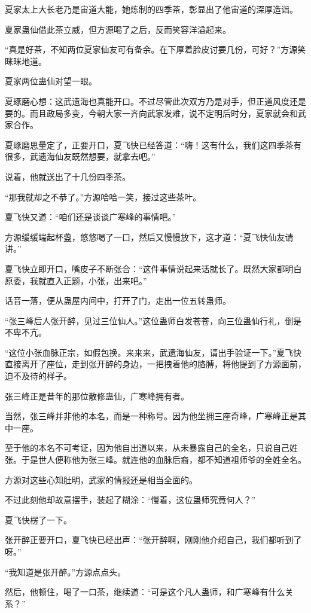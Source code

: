 \begin{this_body}
夏家太上大长老乃是宙道大能，她炼制的四季茶，彰显出了他宙道的深厚造诣。

夏家蛊仙借此茶立威，但方源喝了之后，反而笑容洋溢起来。

“真是好茶，不知两位夏家仙友可有备余。在下厚着脸皮讨要几份，可好？”方源笑眯眯地道。

夏家两位蛊仙对望一眼。

夏琢磨心想：这武遗海也真能开口。不过尽管此次双方乃是对手，但正道风度还是要的。而且政局多变，今朝大家一齐向武家发难，说不定明后时分，夏家就会和武家合作。

夏琢磨思量定了，正要开口，夏飞快已经答道：“嗨！这有什么，我们这四季茶有很多，武遗海仙友既然想要，就拿去吧。”

说着，他就送出了十几份四季茶。

“那我就却之不恭了。”方源哈哈一笑，接过这些茶叶。

夏飞快又道：“咱们还是谈谈广寒峰的事情吧。”

方源缓缓端起杯盏，悠悠喝了一口，然后又慢慢放下，这才道：“夏飞快仙友请讲。”

夏飞快立即开口，嘴皮子不断张合：“这件事情说起来话就长了。既然大家都明白原委，我就直入正题，小张，出来吧。”

话音一落，便从蛊屋内间中，打开了门，走出一位五转蛊师。

“张三峰后人张开醉，见过三位仙人。”这位蛊师白发苍苍，向三位蛊仙行礼，倒是不卑不亢。

“这位小张血脉正宗，如假包换。来来来，武遗海仙友，请出手验证一下。”夏飞快直接离开了座位，走到张开醉的身边，一把拽着他的胳膊，将他提到了方源面前，迫不及待的样子。

张三峰正是昔年的那位散修蛊仙，广寒峰拥有者。

当然，张三峰并非他的本名，而是一种称号。因为他坐拥三座奇峰，广寒峰正是其中一座。

至于他的本名不可考证，因为他自出道以来，从未暴露自己的全名，只说自己姓张。于是世人便称他为张三峰。就连他的血脉后裔，都不知道祖师爷的全姓全名。

方源对这些心知肚明，武家的情报还是相当全面的。

不过此刻他却故意摆手，装起了糊涂：“慢着，这位蛊师究竟何人？”

夏飞快楞了一下。

张开醉正要开口，夏飞快已经出声：“张开醉啊，刚刚他介绍自己，我们都听到了呀。”

“我知道是张开醉。”方源点点头。

然后，他顿住，喝了一口茶，继续道：“可是这个凡人蛊师，和广寒峰有什么关系？”


\end{this_body}
